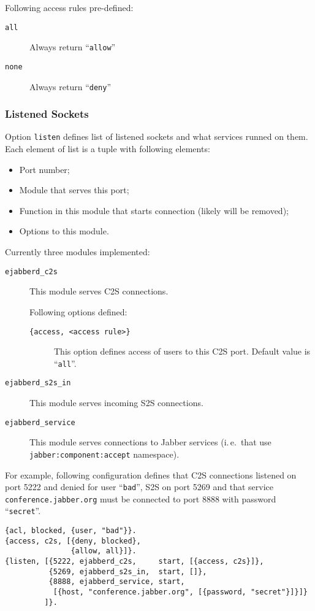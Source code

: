 \documentclass[10pt]{article}
\newcommand{\Jabber}{Jabber}
\begin{document}
Following access rules pre-defined:
\begin{description}
\item[\texttt{all}] Always return ``\texttt{allow}''
\item[\texttt{none}] Always return ``\texttt{deny}''
\end{description}


\subsubsection{Listened Sockets}
\label{sec:configlistened}

Option \texttt{listen} defines list of listened sockets and what services
runned on them.  Each element of list is a tuple with following elements:
\begin{itemize}
\item Port number;
\item Module that serves this port;
\item Function in this module that starts connection (likely will be removed);
\item Options to this module.
\end{itemize}

Currently three modules implemented:
\begin{description}
\item[\texttt{ejabberd\_c2s}] This module serves C2S connections.
  
  Following options defined:
  \begin{description}
  \item[\texttt{\{access, <access rule>\}}] This option defines access of users
    to this C2S port.  Default value is ``\texttt{all}''.
  \end{description}
\item[\texttt{ejabberd\_s2s\_in}] This module serves incoming S2S connections.
\item[\texttt{ejabberd\_service}] This module serves connections to \Jabber{}
  services (i.\,e.\ that use \texttt{jabber:component:accept} namespace).
\end{description}

For example, following configuration defines that C2S connections listened on
port 5222 and denied for user ``\texttt{bad}'', S2S on port 5269 and that
service \texttt{conference.jabber.org} must be connected to port 8888 with
password ``\texttt{secret}''.

\begin{verbatim}
{acl, blocked, {user, "bad"}}.
{access, c2s, [{deny, blocked},
               {allow, all}]}.
{listen, [{5222, ejabberd_c2s,     start, [{access, c2s}]},
          {5269, ejabberd_s2s_in,  start, []},
          {8888, ejabberd_service, start,
           [{host, "conference.jabber.org", [{password, "secret"}]}]}
         ]}.
\end{verbatim}
\end{document}
